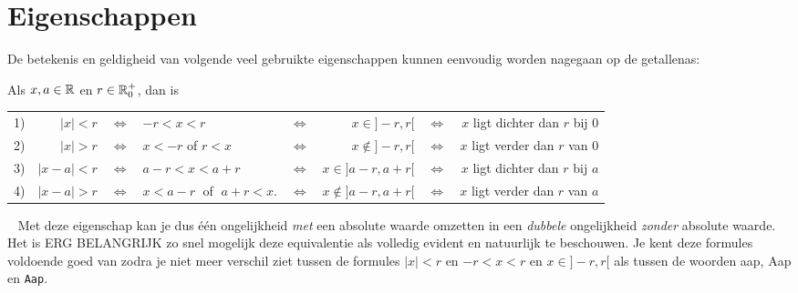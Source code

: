 \documentclass[numbers,wordchoicegiven]{ximera}
\begin{document}
\section{Eigenschappen}
De betekenis en geldigheid van volgende veel gebruikte eigenschappen kunnen eenvoudig worden nagegaan op de getallenas:
\begin{proposition}\label{basisaw}
	Als $x,a \in \mathbb{R}$ en $r\in\mathbb{R}^+_0$, dan is 

	\begin{tabular}{lrclrrrr} 
	1)&$|x|<r$   &$\Leftrightarrow$ &$-r<x<r$  & $\Leftrightarrow$ & $x\in]-r,r[$     & $\Leftrightarrow$&$x$ ligt dichter dan $r$ bij $0$    \\
	2)&$|x|>r$   &$\Leftrightarrow$ &$x<-r$ of $r<x$ & $\Leftrightarrow$ & $x\notin]-r,r[$   & $\Leftrightarrow$ &$x$ ligt verder dan $r$ van $0$    \\
	3)&$|x-a|<r$ & $\Leftrightarrow$ & $ a-r<x<a+r$  & $\Leftrightarrow$ & $x\in]a-r,a+r[$  & $\Leftrightarrow$ & $x$ ligt dichter dan $r$ bij $a$           \\
	4)&$|x-a|>r$ & $\Leftrightarrow$ & $ x<a-r\;$ of $\;a+r<x.$  & $\Leftrightarrow$ & $x\notin]a-r,a+r[$  & $\Leftrightarrow$ & $x$ ligt verder dan $r$ van $a$\\
	\end{tabular}        
\end{proposition}


\begin{remark} \  %
		Met deze eigenschap kan je dus één ongelijkheid \textit{met} een absolute waarde omzetten in een \textit{dubbele} ongelijkheid \textit{zonder} absolute waarde. Het is ERG BELANGRIJK zo snel mogelijk deze equivalentie als volledig evident en natuurlijk te beschouwen. Je kent deze formules voldoende goed van zodra je niet meer verschil ziet tussen de formules $|x|<r$ en $-r<x<r$ en $x\in]-r,r[$ als tussen de woorden aap, Aap en \texttt{Aap}.
\end{remark}
\end{document}
